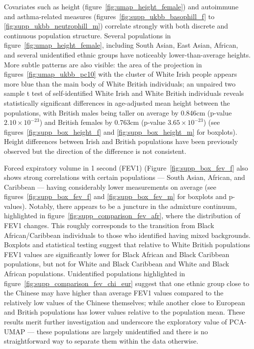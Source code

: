 \documentclass[12pt]{pnas-new}
\begin{document}
Covariates such as height (figure~\ref{fig:umap_height_female}) and autoimmune and asthma-related measures  (figures~\ref{fig:supp_ukbb_basophill_f} to \ref{fig:supp_ukbb_neutrophill_m}) correlate strongly with both discrete and continuous population structure. Several populations in figure~\ref{fig:umap_height_female}, including South Asian, East Asian, African, and several unidentified ethnic groups have noticeably lower-than-average heights. More subtle patterns are also visible: the area of the projection in figures~\ref{fig:umap_ukbb_pc10} with the cluster of White Irish people appears more blue than the main body of White British individuals; an unpaired two sample t test of self-identified White Irish and White British individuals reveals statistically significant differences in age-adjusted mean height between the populations, with British males being taller on average by 0.846cm (p-value $2.10\times 10^{-23}$) and British females by 0.763cm (p-value $3.65\times 10^{-23}$) (see figures~\ref{fig:supp_box_height_f} and \ref{fig:supp_box_height_m} for boxplots). Height differences between Irish and British populations have been previously observed but the direction of the difference is not consistent\cite{robinson2015population,komlos1994stature}.

 Forced expiratory volume in 1 second (FEV1) (Figure~\ref{fig:supp_box_fev_f} also shows strong correlations with certain populations --- South Asian, African, and Caribbean --- having considerably lower measurements on average (see figures~\ref{fig:supp_box_fev_f} and \ref{fig:supp_box_fev_m} for boxplots and p-values). Notably, there appears to be a juncture in the admixture continuum, highlighted in figure~\ref{fig:supp_comparison_fev_afr}, where the distribution of FEV1 changes. This roughly corresponds to the transition from Black African/Caribbean individuals to those who identified having mixed backgrounds. Boxplots and statistical testing suggest that relative to White British populations FEV1 values are significantly lower for Black African and Black Caribbean populations, but not for White and Black Caribbean and White and Black African populations. Unidentified populations highlighted in figure~\ref{fig:supp_comparison_fev_chi_eur} suggest that one ethnic group close to the Chinese may have higher than average FEV1 values compared to the relatively low values of the Chinese themselves; while another close to European and British populations has lower values relative to the population mean. These results merit further investigation and underscore the exploratory value of PCA-UMAP --- these  populations are largely unidentified and there is no straightforward way to separate them within the data otherwise.
\end{document}
